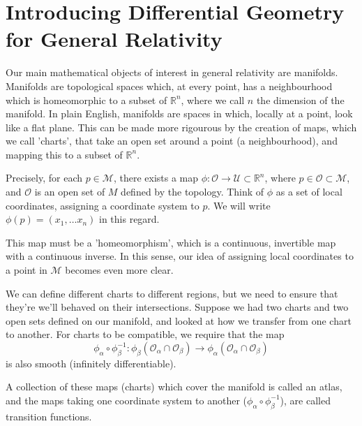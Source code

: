 \section{Introducing Differential Geometry for General Relativity} 
Our main mathematical objects of interest in general relativity are manifolds. Manifolds are topological spaces which, at every point, has a neighbourhood which is homeomorphic to a subset of $\mathbb{R}^n$, where we call $n$ the dimension of the manifold. In plain English, manifolds are spaces in which, locally at a point, look like a flat plane. This can be made more rigourous by the creation of maps, which we call 'charts', that take an open set around a point (a neighbourhood), and mapping this to a subset of $\mathbb{R}^n$. 

Precisely, for each $p \in \mathcal{M}$, there exists a map $\phi : \mathcal{O} \rightarrow \mathcal{U} \subset \mathbb{R}^n$, where $p \in \mathcal{ O} \subset \mathcal{M}$, and $\mathcal{ O} $ is an open set of $M$ defined by the topology. Think of $\phi$ as a set of local coordinates, assigning a coordinate system to $ p$. We will write $\phi(p) = (x_1, \dots x_n) $ in this regard.   

This map must be a 'homeomorphism', which is a continuous, invertible map with a continuous inverse. In this sense, our idea of assigning local coordinates to a point in $\mathcal{M}$ becomes even more clear. 

We can define different charts to different regions, but we need to ensure that they're we'll behaved on their intersections. Suppose we had two charts and two open sets defined on our manifold, and looked at how we transfer from one chart to another. For charts to be compatible, we require that the map 
\[ 
\phi_\alpha \circ \phi_\beta^{ -1}: \phi_\beta ( \mathcal{ O}_\alpha \cap \mathcal{O}_\beta ) \rightarrow \phi_\alpha (\mathcal{ O}_\alpha \cap \mathcal{O}_\beta )
\] is also smooth (infinitely differentiable). 

A collection of these maps (charts) which cover the manifold is called an atlas, and the maps taking one coordinate system to another ($\phi_\alpha \circ \phi_\beta^{ -1} $), are called transition functions. 

